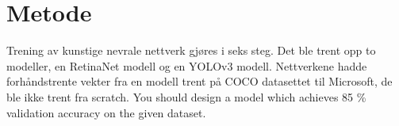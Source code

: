 


\section{Metode}




Trening av kunstige nevrale nettverk gjøres i seks steg. Det ble trent opp to modeller, en RetinaNet modell og en YOLOv3 modell. Nettverkene hadde forhåndstrente vekter fra en modell trent på COCO datasettet til Microsoft, de ble ikke trent fra scratch. You should design a model which achieves 85 \% validation accuracy on the given dataset.

